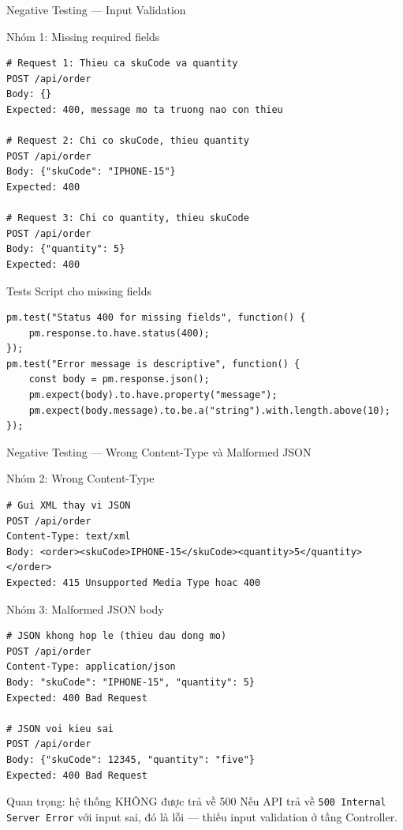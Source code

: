 \documentclass[aspectratio=169,10pt]{beamer}
\begin{document}
\begin{frame}[fragile]{Negative Testing --- Input Validation}
  \begin{block}{Nhóm 1: Missing required fields}
\begin{lstlisting}[style=bash]
# Request 1: Thieu ca skuCode va quantity
POST /api/order
Body: {}
Expected: 400, message mo ta truong nao con thieu

# Request 2: Chi co skuCode, thieu quantity
POST /api/order
Body: {"skuCode": "IPHONE-15"}
Expected: 400

# Request 3: Chi co quantity, thieu skuCode
POST /api/order
Body: {"quantity": 5}
Expected: 400
\end{lstlisting}
  \end{block}

  \begin{block}{Tests Script cho missing fields}
\begin{lstlisting}[style=nonumber]
pm.test("Status 400 for missing fields", function() {
    pm.response.to.have.status(400);
});
pm.test("Error message is descriptive", function() {
    const body = pm.response.json();
    pm.expect(body).to.have.property("message");
    pm.expect(body.message).to.be.a("string").with.length.above(10);
});
\end{lstlisting}
  \end{block}
\end{frame}

\begin{frame}[fragile]{Negative Testing --- Wrong Content-Type và Malformed JSON}
  \begin{block}{Nhóm 2: Wrong Content-Type}
\begin{lstlisting}[style=bash]
# Gui XML thay vi JSON
POST /api/order
Content-Type: text/xml
Body: <order><skuCode>IPHONE-15</skuCode><quantity>5</quantity></order>
Expected: 415 Unsupported Media Type hoac 400
\end{lstlisting}
  \end{block}

  \begin{block}{Nhóm 3: Malformed JSON body}
\begin{lstlisting}[style=bash]
# JSON khong hop le (thieu dau dong mo)
POST /api/order
Content-Type: application/json
Body: "skuCode": "IPHONE-15", "quantity": 5}
Expected: 400 Bad Request

# JSON voi kieu sai
POST /api/order
Body: {"skuCode": 12345, "quantity": "five"}
Expected: 400 Bad Request
\end{lstlisting}
  \end{block}

  \begin{alertblock}{Quan trọng: hệ thống KHÔNG được trả về 500}
    Nếu API trả về \texttt{500 Internal Server Error} với input sai,
    đó là lỗi --- thiếu input validation ở tầng Controller.
  \end{alertblock}
\end{frame}
\end{document}
